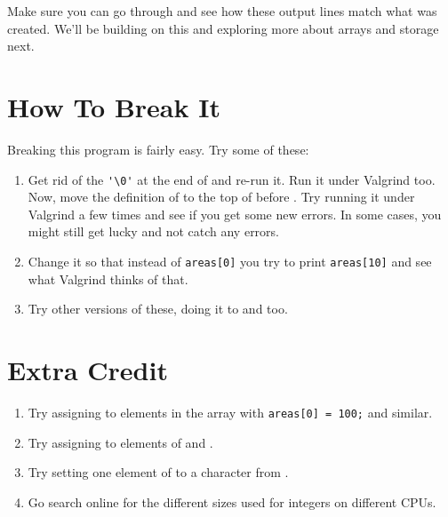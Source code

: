 Make sure you can go through and see how these output lines match
what was created.  We'll be building on this and exploring more
about arrays and storage next.

\section{How To Break It}

Breaking this program is fairly easy.  Try some of these:

\begin{enumerate}
\item Get rid of the \verb|'\0'| at the end of 
    and re-run it.  Run it under Valgrind too.  Now, move the definition
    of  to the top of  before .
    Try running it under Valgrind a few times and see if you get some 
    new errors.  In some cases, you might still get lucky and not catch
    any errors.
\item Change it so that instead of \verb|areas[0]| you try to
    print \verb|areas[10]| and see what Valgrind thinks of that.
\item Try other versions of these, doing it to  and
     too.
\end{enumerate}

\section{Extra Credit}

\begin{enumerate}
\item Try assigning to elements in the  array with \verb|areas[0] = 100;| and similar.
\item Try assigning to elements of  and .
\item Try setting one element of  to a character from .
\item Go search online for the different sizes used for integers on different
    CPUs.
\end{enumerate}

